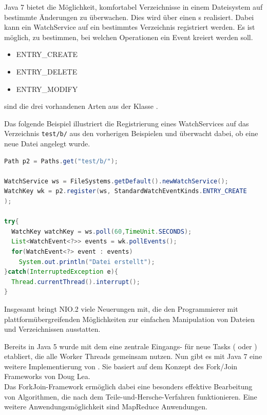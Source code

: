 \documentclass[times, 10pt,twocolumn]{article}
\begin{document}
Java 7 bietet die Möglichkeit, komfortabel Verzeichnisse in einem Dateisystem auf bestimmte Änderungen zu überwachen.
Dies wird über einen s realisiert. Dabei kann ein WatchService auf ein bestimmtes Verzeichnis registriert
werden. Es ist möglich, zu bestimmen, bei welchen Operationen ein Event kreiert werden soll.
\begin{itemize}
  \item ENTRY\_CREATE
  \item ENTRY\_DELETE
  \item ENTRY\_MODIFY
\end{itemize}
sind die drei vorhandenen Arten aus der Klasse .

Das folgende Beispiel illustriert die Registrierung eines WatchServices auf das Verzeichnis \texttt{test/b/} aus den vorherigen
Beispielen und überwacht dabei, ob eine neue Datei angelegt wurde.
\begin{lstlisting}[language=java,breaklines=true]
Path p2 = Paths.get("test/b/");

WatchService ws = FileSystems.getDefault().newWatchService();
WatchKey wk = p2.register(ws, StandardWatchEventKinds.ENTRY_CREATE
);

try{
  WatchKey watchKey = ws.poll(60,TimeUnit.SECONDS);
  List<WatchEvent<?>> events = wk.pollEvents();
  for(WatchEvent<?> event : events)
    System.out.println("Datei erstellt");
}catch(InterruptedException e){
  Thread.currentThread().interrupt();
}
\end{lstlisting}

Insgesamt bringt NIO.2 viele Neuerungen mit, die den Programmierer mit plattformübergreifenden Möglichkeiten zur einfachen
Manipulation von Dateien und Verzeichnissen ausstatten. 

Bereits in Java 5 wurde mit dem  eine zentrale Eingangs- für neue Tasks ( oder ) etabliert, die alle Worker Threads gemeinsam nutzen. Nun gibt es mit Java 7 eine weitere Implementierung von . Sie basiert auf dem Konzept des Fork/Join Frameworks\cite{forkjoinpaper} von Doug Lea.\cite{forkjoinheise}\\

Das ForkJoin-Framework ermöglich dabei eine besonders effektive Bearbeitung von Algorithmen, die nach dem Teile-und-Hersche-Verfahren funktionieren. Eine weitere Anwendungsmöglichkeit sind MapReduce Anwendungen.\\
\end{document}
